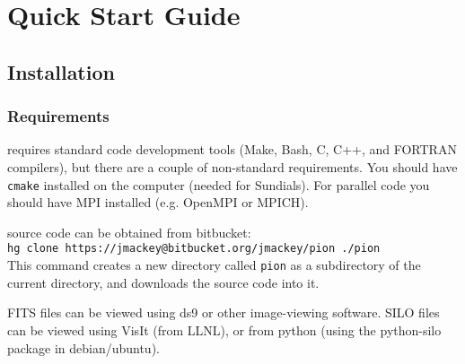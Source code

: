 \documentclass[a4paper,11pt]{report}
\begin{document}
\newpage
{}
\tableofcontents
\newpage


\chapter{Quick Start Guide}


\section{Installation}

\subsection{Requirements}
\pion{} requires standard code development tools (Make, Bash, C, C++, and FORTRAN compilers), but there are a couple of non-standard requirements.
You should have \verb|cmake| installed on the computer (needed for Sundials).
For parallel code you should have MPI installed (e.g. OpenMPI or MPICH).

\pion{} source code can be obtained from bitbucket:\\
\verb|hg clone https://jmackey@bitbucket.org/jmackey/pion ./pion|\\
This command creates a new directory called \verb|pion| as a subdirectory of the current directory, and downloads the \pion{} source code into it.

FITS files can be viewed using ds9 or other image-viewing software.
SILO files can be viewed using VisIt (from LLNL), or from python (using the python-silo package in debian/ubuntu).

\end{document}
